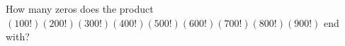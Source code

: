 How many zeros does the product \((100!)(200!)(300!)(400!)(500!)(600!)(700!)(800!)(900!)\) end with?
